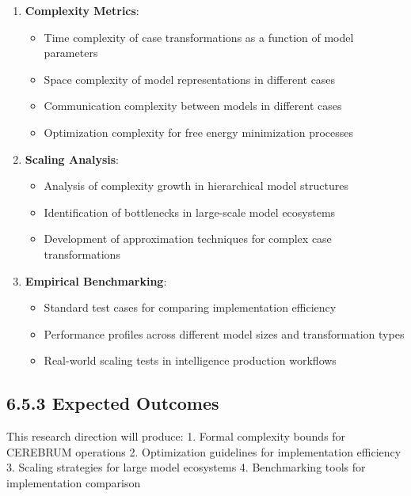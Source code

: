 \documentclass[
  11pt,
  letterpaper,
]{article}
\providecommand{\tightlist}{%
  \setlength{\itemsep}{0pt}\setlength{\parskip}{0pt}}
\begin{document}
\begin{enumerate}
\def\labelenumi{\arabic{enumi}.}
\tightlist
\item
  \textbf{Complexity Metrics}:

  \begin{itemize}
  \tightlist
  \item
    Time complexity of case transformations as a function of model
    parameters
  \item
    Space complexity of model representations in different cases
  \item
    Communication complexity between models in different cases
  \item
    Optimization complexity for free energy minimization processes
  \end{itemize}
\item
  \textbf{Scaling Analysis}:

  \begin{itemize}
  \tightlist
  \item
    Analysis of complexity growth in hierarchical model structures
  \item
    Identification of bottlenecks in large-scale model ecosystems
  \item
    Development of approximation techniques for complex case
    transformations
  \end{itemize}
\item
  \textbf{Empirical Benchmarking}:

  \begin{itemize}
  \tightlist
  \item
    Standard test cases for comparing implementation efficiency
  \item
    Performance profiles across different model sizes and transformation
    types
  \item
    Real-world scaling tests in intelligence production workflows
  \end{itemize}
\end{enumerate}

\hypertarget{expected-outcomes}{%
\subsection{6.5.3 Expected Outcomes}\label{expected-outcomes}}

This research direction will produce: 1. Formal complexity bounds for
CEREBRUM operations 2. Optimization guidelines for implementation
efficiency 3. Scaling strategies for large model ecosystems 4.
Benchmarking tools for implementation comparison
\end{document}
